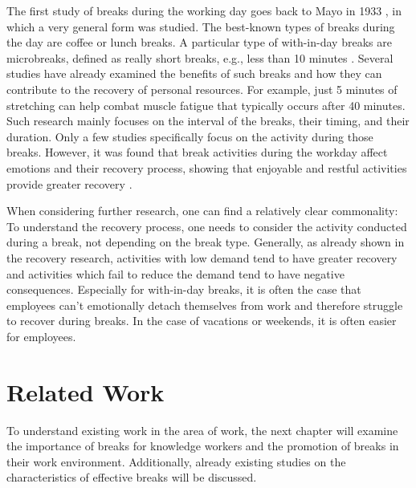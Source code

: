 \documentclass{hasel_thesis}
\begin{document}
The first study of breaks during the working day goes back to Mayo in 1933 \cite{Mayo.1933}, in which a very general form was studied. The best-known types of breaks during the day are coffee or lunch breaks. A particular type of with-in-day breaks are microbreaks, defined as really short breaks, e.g., less than 10 minutes \cite{BennettAndrewA.GabrielAllisonS.CalderwoodCharles.2020}. Several studies have already examined the benefits of such breaks and how they can contribute to the recovery of personal resources. For example, just 5 minutes of stretching can help combat muscle fatigue that typically occurs after 40 minutes. Such research mainly focuses on the interval of the breaks, their timing, and their duration. Only a few studies specifically focus on the activity during those breaks. However, it was found that break activities during the workday affect emotions and their recovery process, showing that enjoyable and restful activities provide greater recovery \cite{Trougakos2008}. 

When considering further research, one can find a relatively clear commonality: To understand the recovery process, one needs to consider the activity conducted during a break, not depending on the break type. Generally, as already shown in the recovery research, activities with low demand tend to have greater recovery and activities which fail to reduce the demand tend to have negative consequences. Especially for with-in-day breaks, it is often the case that employees can't emotionally detach themselves from work and therefore struggle to recover during breaks. In the case of vacations or weekends, it is often easier for employees.



\chapter{Related Work}
\begin{comment} 
- Overview of previous research on knowledge worker motivation and breaks
- Relevant theories and concepts related to knowledge worker motivation and breaks
- Previous studies and research works on the impact of breaks on productivity and well-being
\end{comment}
To understand existing work in the area of work, the next chapter will examine the importance of breaks for knowledge workers and the promotion of breaks in their work environment. Additionally, already existing studies on the characteristics of effective breaks will be discussed.
\end{document}
